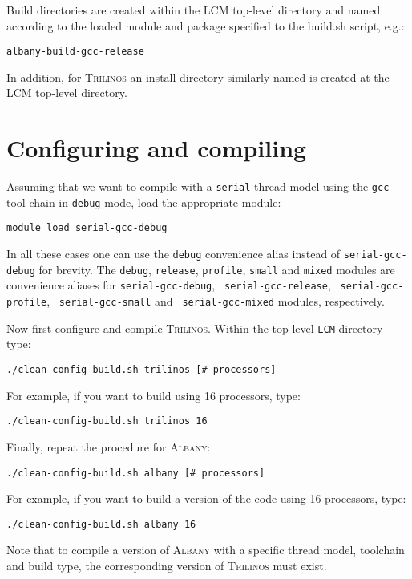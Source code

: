 \documentclass{article}
\newcommand{\trilinos}{\textsc{Trilinos}}
\newcommand{\albany}{\textsc{Albany}}
\newcommand{\lcm}{\textsc{LCM}}
\begin{document}
Build directories are created within the \lcm{} top-level directory
and named according to the loaded module and package specified to the
build.sh script, e.g.:
\begin{verbatim}
albany-build-gcc-release
\end{verbatim}
In addition, for \trilinos{} an install directory similarly named is
created at the \lcm{} top-level directory.

\section{Configuring and compiling}
\label{sec:config-build}

Assuming that we want to compile with a \verb+serial+ thread model
using the \verb+gcc+ tool chain in \verb+debug+ mode, load the
appropriate module:
\begin{verbatim}
module load serial-gcc-debug
\end{verbatim}

In all these cases one can use the \verb+debug+ convenience alias instead of
\verb+serial-gcc-debug+ for brevity. The \verb+debug+, \verb+release+,
\verb+profile+, \verb+small+ and \verb+mixed+ modules are convenience aliases
for \verb+serial-gcc-debug+, \verb+ serial-gcc-release+,
\verb+ serial-gcc-profile+, \verb+ serial-gcc-small+ and
\verb+ serial-gcc-mixed+ modules, respectively.

Now first configure and compile \trilinos{}. Within the top-level
\verb+LCM+ directory type:
\begin{verbatim}
./clean-config-build.sh trilinos [# processors]
\end{verbatim}
For example, if you want to build using 16 processors, type:
\begin{verbatim}
./clean-config-build.sh trilinos 16
\end{verbatim}
Finally, repeat the procedure for \albany{}:
\begin{verbatim}
./clean-config-build.sh albany [# processors]
\end{verbatim}
For example, if you want to build a version of the code using 16
processors, type:
\begin{verbatim}
./clean-config-build.sh albany 16
\end{verbatim}

Note that to compile a version of \albany{} with a specific thread model,
toolchain and build type, the corresponding version of \trilinos{} must
exist.
\end{document}
